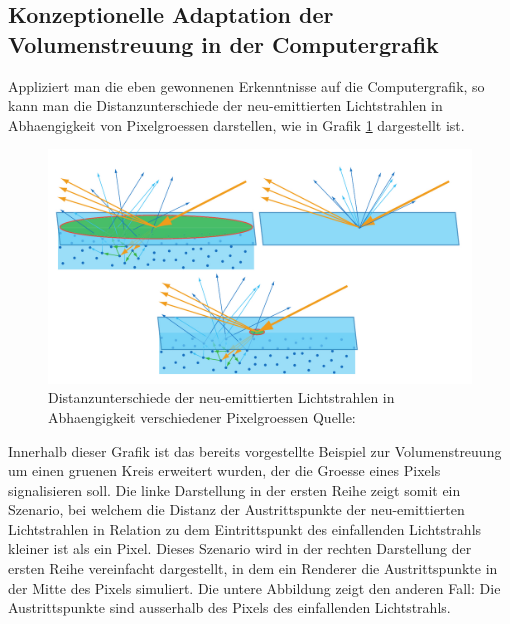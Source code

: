 \documentclass[ngerman,runningheads,a4paper]{llncs}[2018/03/10]
\begin{document}
\subsection{Konzeptionelle Adaptation der Volumenstreuung in der Computergrafik}

Appliziert man die eben gewonnenen Erkenntnisse auf die Computergrafik, so kann man die Distanzunterschiede der neu-emittierten Lichtstrahlen in Abhaengigkeit von Pixelgroessen darstellen, wie in Grafik \ref{fig:subsurface-scattering-pixel-considerations} dargestellt ist.

\begin{figure}[!h]
  \centering
  \includegraphics[scale=0.2,keepaspectratio]{./images/subsurface-scattering-pixel-considerations.jpg}
  \caption{Distanzunterschiede der neu-emittierten Lichtstrahlen in Abhaengigkeit verschiedener Pixelgroessen Quelle: \cite{real-time-rendering}}
  \label{fig:subsurface-scattering-pixel-considerations}
\end{figure}

Innerhalb dieser Grafik ist das bereits vorgestellte Beispiel zur Volumenstreuung um einen gruenen Kreis erweitert wurden, der die Groesse eines Pixels signalisieren soll.
Die linke Darstellung in der ersten Reihe zeigt somit ein Szenario, bei welchem die Distanz der Austrittspunkte der neu-emittierten Lichtstrahlen in Relation zu dem Eintrittspunkt des einfallenden Lichtstrahls kleiner ist als ein Pixel.
Dieses Szenario wird in der rechten Darstellung der ersten Reihe  vereinfacht dargestellt, in dem ein Renderer die Austrittspunkte in der Mitte des Pixels simuliert.
Die untere Abbildung zeigt den anderen Fall: Die Austrittspunkte sind ausserhalb des Pixels des einfallenden Lichtstrahls.
\end{document}
